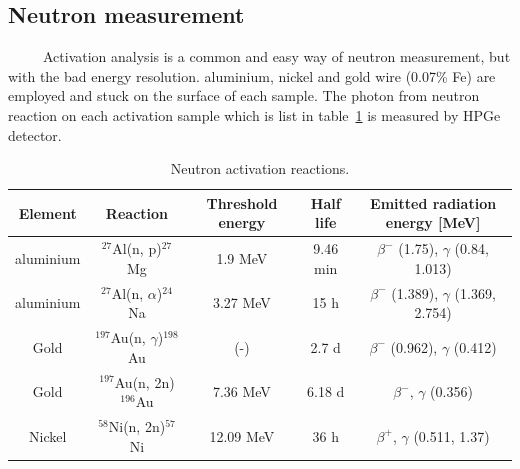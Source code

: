  \subsection{Neutron measurement}
~~~~~Activation analysis is a common and easy way of neutron measurement, but with the bad energy resolution.
aluminium, nickel and gold wire (0.07\% Fe) are employed and stuck on the surface of each sample.
The photon from neutron reaction on each activation sample which is list in table~\ref{act} is measured by HPGe detector.
\begin{table}[H]
 \centering
 \begin{tabular}{ccccc} \hline \hline
  Element & Reaction & Threshold energy & Half life & Emitted radiation energy [MeV] \\ \hline
  aluminium & $^{27}$Al(n, p)$^{27}$Mg & 1.9 MeV & 9.46 min & $\beta^-$ (1.75), $\gamma$ (0.84, 1.013) \\
  aluminium & $^{27}$Al(n, $\alpha$)$^{24}$Na & 3.27 MeV & 15 h & $\beta^-$ (1.389), $\gamma$ (1.369, 2.754) \\
  Gold & $^{197}$Au(n, $\gamma$)$^{198}$Au & (-) & 2.7 d & $\beta^-$ (0.962), $\gamma$ (0.412) \\
  Gold & $^{197}$Au(n, 2n)$^{196}$Au & 7.36 MeV & 6.18 d & $\beta^-$, $\gamma$ (0.356) \\
  Nickel & $^{58}$Ni(n, 2n)$^{57}$Ni & 12.09 MeV & 36 h & $\beta^+$, $\gamma$ (0.511, 1.37) \\ \hline \hline
 \end{tabular}
 \caption{Neutron activation reactions.}
 \label{act}
\end{table}
